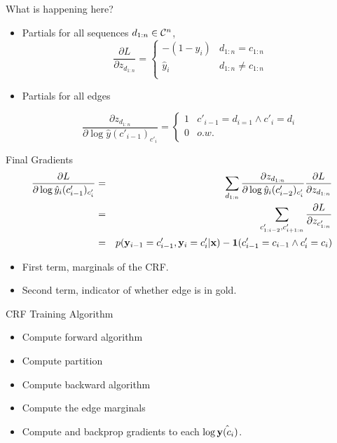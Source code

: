 \documentclass{beamer}
\begin{document}
 \begin{frame}{What is happening here?}
   \begin{itemize}
   \item Partials for all sequences $d_{1:n} \in \mathcal{C}^n$,
   \[ \frac{\partial L }{\partial z_{d_{1:n}}} =
     \begin{cases}
       -(1 - \hat{y}_i) & d_{1:n} = c_{1:n}\\
       \hat{y}_i  & d_{1:n} \neq c_{1:n} \\
     \end{cases} \]

   \item 
     Partials for all edges

     \[ \frac{\partial z_{d_{1:n}} }{\partial\log \hat{y}(c'_{i-1})_{c'_{i}}} =
         \begin{cases}
           1 & c'_{i-1} = d_{i=1} \land c'_{i} = d_{i}\\
           0  & o.w. \\
         \end{cases} \]
     \end{itemize}
 \end{frame}
     
 \begin{frame}{Final Gradients}
   \begin{eqnarray*}
    \frac{\partial L}{\partial \log \hat{y}_i(c'_{i-1})_{c'_{i}}} &=&
    \sum_{d_{1:n}} \frac{\partial z_{d_{1:n}} }{\partial \log \hat{y}_i(c'_{i-2})_{c'_{i}}} \frac{\partial L } {\partial z_{d_{1:n}}}  \\
     &=& \sum_{c'_{1:i-2}, c'_{i+1:n}}  \frac{\partial L }{\partial z_{c'_{1:n}}}  \\
    &=& p(\mathbf{y}_{i-1} = c'_{i-1}, \mathbf{y}_{i} = c'_{i}  | \mathbf{x}) - \mathbf{1}(c'_{i-1} = c_{i-1} \land c'_{i} = c_i)
   \end{eqnarray*}

   \begin{itemize}
   \item First term, marginals of the CRF. 

     \air 

   \item Second term, indicator of whether edge is in gold.
   \end{itemize}
 \end{frame}


 \begin{frame}{CRF Training Algorithm}
   \begin{itemize}
   \item Compute forward algorithm
     \air
   \item Compute partition
     \air
   \item Compute backward algorithm
     \air
   \item Compute the edge marginals
     \air
   \item Compute and backprop gradients to each $\log \hat{\bold{y}(c_i)}$. 
   \end{itemize}

 \end{frame}
\end{document}
